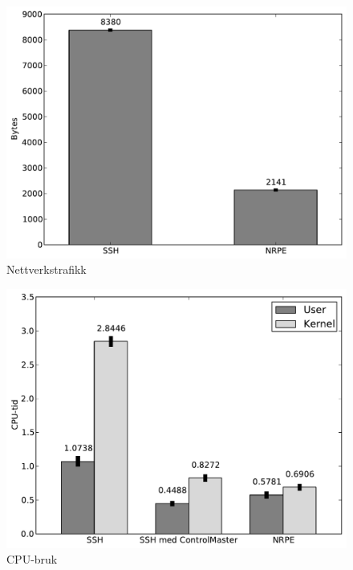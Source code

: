 \begin{figure}[H]
    \centering
    \includegraphics[scale=0.6]{img/nettverkstrafikk}
    \caption{Nettverkstrafikk}
    \label{network_traffic}
\end{figure}

\begin{figure}[H]
    \centering
    \includegraphics[scale=0.6]{img/cpubruk}
    \caption{CPU-bruk}
    \label{cpu_usage}
\end{figure}

